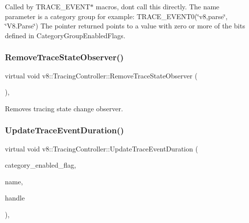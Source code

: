 Called by T\+R\+A\+C\+E\+\_\+\+E\+V\+E\+N\+T$\ast$ macros, don\textquotesingle{}t call this directly. The name parameter is a category group for example\+: T\+R\+A\+C\+E\+\_\+\+E\+V\+E\+N\+T0(\char`\"{}v8,parse\char`\"{}, \char`\"{}\+V8.\+Parse\char`\"{}) The pointer returned points to a value with zero or more of the bits defined in Category\+Group\+Enabled\+Flags. \mbox{\label{classv8_1_1TracingController_ab8d5b3ac795188effb423fa2c0514353}} 
\subsubsection{\texorpdfstring{Remove\+Trace\+State\+Observer()}{RemoveTraceStateObserver()}}
{\footnotesize\ttfamily virtual void v8\+::\+Tracing\+Controller\+::\+Remove\+Trace\+State\+Observer (\begin{DoxyParamCaption}\item[{\mbox{\hyperlink{classv8_1_1TracingController_1_1TraceStateObserver}{Trace\+State\+Observer}} $\ast$}]{ }\end{DoxyParamCaption})\hspace{0.3cm}{\ttfamily [inline]}, {\ttfamily [virtual]}}

Removes tracing state change observer. \mbox{\label{classv8_1_1TracingController_ac1fda6cdae5f6515b896b3df05d5a97e}} 
\subsubsection{\texorpdfstring{Update\+Trace\+Event\+Duration()}{UpdateTraceEventDuration()}}
{\footnotesize\ttfamily virtual void v8\+::\+Tracing\+Controller\+::\+Update\+Trace\+Event\+Duration (\begin{DoxyParamCaption}\item[{const uint8\+\_\+t $\ast$}]{category\+\_\+enabled\+\_\+flag,  }\item[{const char $\ast$}]{name,  }\item[{uint64\+\_\+t}]{handle }\end{DoxyParamCaption})\hspace{0.3cm}{\ttfamily [inline]}, {\ttfamily [virtual]}}

